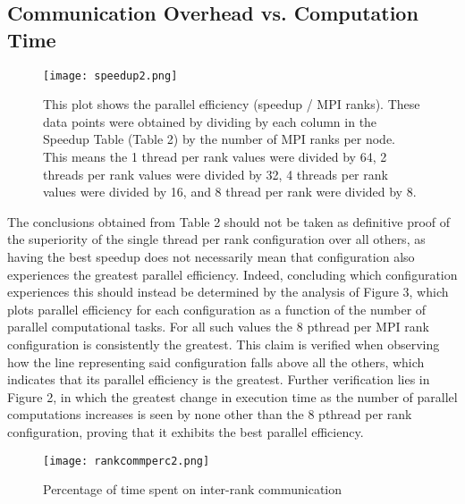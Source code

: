 \documentclass[letterpaper, 10 pt, conference]{ieeeconf}  %
\begin{document}
\subsection{Communication Overhead vs. Computation Time}
\begin{figure}[!htbp]
  \texttt{[image: speedup2.png]}
  \caption{This plot shows the parallel efficiency (speedup / MPI ranks).  These data points were obtained by dividing by each column in the Speedup Table  (Table 2) by the number of MPI ranks per node.  This means the 1 thread per rank values were divided by 64, 2 threads per rank values were divided by 32, 4 threads per rank values were divided by 16, and 8 thread per rank were divided by 8.}
\end{figure}

The conclusions obtained from Table 2 should not be taken as definitive proof of the superiority of the single thread per rank configuration over all others, as having the best speedup does not necessarily mean that configuration also experiences the greatest parallel efficiency.  Indeed, concluding which configuration experiences this should instead be determined by the analysis of Figure 3, which plots parallel efficiency for each configuration as a function of the number of parallel computational tasks.  For all such values the 8 pthread per MPI rank configuration is consistently the greatest.  This claim is verified when observing how the line representing said configuration falls above all the others, which indicates that its parallel efficiency is the greatest.  Further verification lies in Figure 2, in which the greatest change in execution time as the number of parallel computations increases is seen by none other than the 8 pthread per rank configuration, proving that it exhibits the best parallel efficiency.

\begin{figure}[!htbp]
  \texttt{[image: rankcommperc2.png]}
  \caption{Percentage of time spent on inter-rank communication}
\end{figure}
\end{document}
